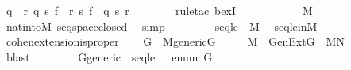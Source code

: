 \begin{isabellebody}
\ {\isachardoublequoteopen}{\isasymexists}q{\isasymin}{}{\isacharcircum}{\kern0pt}{\isacharless}{\kern0pt}{\isasymomega}{\isachardot}{\kern0pt}\ \ {\isasymexists}r{\isasymin}{}{\isacharcircum}{\kern0pt}{\isacharless}{\kern0pt}{\isasymomega}{\isachardot}{\kern0pt}\ q\ {\isasympreceq}s\ f\ {\isasymand}\ r\ {\isasympreceq}s\ f\ {\isasymand}\ q\ {\isasymbottom}s\ r{\isachardoublequoteclose}\isanewline
\ \ \ \ \ \ \isamarkupfalse%
\ {\isacharparenleft}{\kern0pt}rule{\isacharunderscore}{\kern0pt}tac\ bexI{\isacharparenright}{\kern0pt}{\isacharplus}{\kern0pt}\ %
\isanewline
\ \ \isamarkupfalse%
\isanewline
\ \ \ \ \isamarkupfalse%
\ {\isachardoublequoteopen}{}{\isacharcircum}{\kern0pt}{\isacharless}{\kern0pt}{\isasymomega}\ {\isasymin}\ M{\isachardoublequoteclose}\ \isamarkupfalse%
\ nat{\isacharunderscore}{\kern0pt}into{\isacharunderscore}{\kern0pt}M\ seqspace{\isacharunderscore}{\kern0pt}closed\ \isamarkupfalse%
\ simp\isanewline
\ \ \isamarkupfalse%
\isanewline
\ \ \ \ \isamarkupfalse%
\ {\isachardoublequoteopen}seqle\ {\isasymin}\ M{\isachardoublequoteclose}\ \isamarkupfalse%
\ seqle{\isacharunderscore}{\kern0pt}in{\isacharunderscore}{\kern0pt}M\ \isacommand{{\isachardot}{\kern0pt}}\isamarkupfalse%
\isanewline
\ \ \isamarkupfalse%
\isanewline
\ \ \isamarkupfalse%
\ cohen{\isacharunderscore}{\kern0pt}extension{\isacharunderscore}{\kern0pt}is{\isacharunderscore}{\kern0pt}proper\isanewline
\ \ \isamarkupfalse%
\ G\ \ {\isachardoublequoteopen}M{\isacharunderscore}{\kern0pt}generic{\isacharparenleft}{\kern0pt}G{\isacharparenright}{\kern0pt}{\isachardoublequoteclose}\ \isanewline
\ \ \ \ {\isachardoublequoteopen}M\ {\isasymnoteq}\ GenExt{\isacharparenleft}{\kern0pt}G{\isacharparenright}{\kern0pt}{\isachardoublequoteclose}\ {\isacharparenleft}{\kern0pt}\ {\isachardoublequoteopen}M{\isasymnoteq}{\isacharquery}{\kern0pt}N{\isachardoublequoteclose}{\isacharparenright}{\kern0pt}\ \isanewline
\ \ \ \ \isamarkupfalse%
\ blast\isanewline
\ \ \isamarkupfalse%
\ \isanewline
\ \ \isamarkupfalse%
\ G{\isacharunderscore}{\kern0pt}generic\ {\isachardoublequoteopen}{}{\isacharcircum}{\kern0pt}{\isacharless}{\kern0pt}{\isasymomega}{\isachardoublequoteclose}\ seqle\ {}\ {\isacharunderscore}{\kern0pt}\ enum\ G\ \isamarkupfalse%

\end{isabellebody}
